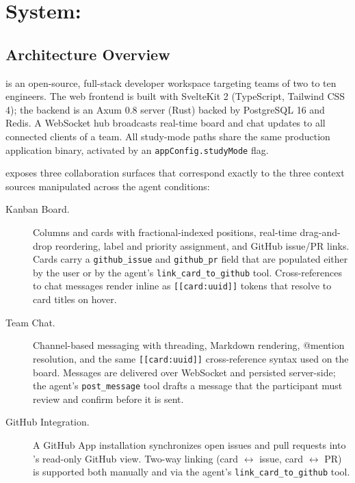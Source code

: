 \section{System: \Weld}
\label{sec:system}

\subsection{Architecture Overview}
\label{sec:system:overview}

\Weld is an open-source, full-stack developer workspace targeting teams of
two to ten engineers. The web frontend is built with SvelteKit 2 (TypeScript,
Tailwind CSS 4); the backend is an Axum 0.8 server (Rust) backed by PostgreSQL
16 and Redis. A WebSocket hub broadcasts real-time board and chat updates to all
connected clients of a team. All study-mode paths share the same production
application binary, activated by an \texttt{appConfig.studyMode} flag.

\Weld exposes three collaboration surfaces that correspond exactly to the three
context sources manipulated across the agent conditions:

\begin{description}
  \item[Kanban Board.]
    Columns and cards with fractional-indexed positions, real-time drag-and-drop
    reordering, label and priority assignment, and GitHub issue/PR links. Cards
    carry a \texttt{github\_issue} and \texttt{github\_pr} field that are
    populated either by the user or by the agent's \texttt{link\_card\_to\_github}
    tool. Cross-references to chat messages render inline as
    \texttt{[[card:uuid]]} tokens that resolve to card titles on hover.

  \item[Team Chat.]
    Channel-based messaging with threading, Markdown rendering, @mention
    resolution, and the same \texttt{[[card:uuid]]} cross-reference syntax used
    on the board. Messages are delivered over WebSocket and persisted
    server-side; the agent's \texttt{post\_message} tool drafts a message that
    the participant must review and confirm before it is sent.

  \item[GitHub Integration.]
    A GitHub App installation synchronizes open issues and pull requests into
    \Weld's read-only GitHub view. Two-way linking (card $\leftrightarrow$
    issue, card $\leftrightarrow$ PR) is supported both manually and via the
    agent's \texttt{link\_card\_to\_github} tool.
\end{description}


